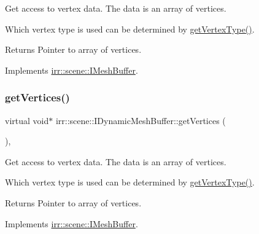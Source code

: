 Get access to vertex data. The data is an array of vertices. 

Which vertex type is used can be determined by \hyperlink{classirr_1_1scene_1_1IDynamicMeshBuffer_a3e7523774efaf9a177de6396dfdc14e2}{get\+Vertex\+Type()}. \begin{DoxyReturn}{Returns}
Pointer to array of vertices. 
\end{DoxyReturn}


Implements \hyperlink{classirr_1_1scene_1_1IMeshBuffer_a99891e516246b2cff13b362a435c8028}{irr\+::scene\+::\+I\+Mesh\+Buffer}.

\mbox{\label{classirr_1_1scene_1_1IDynamicMeshBuffer_a449643505823c7cfe793c5a82cde5fa4}} 
\subsubsection{\texorpdfstring{get\+Vertices()}{getVertices()}\hspace{0.1cm}{\footnotesize\ttfamily [2/2]}}
{\footnotesize\ttfamily virtual void$\ast$ irr\+::scene\+::\+I\+Dynamic\+Mesh\+Buffer\+::get\+Vertices (\begin{DoxyParamCaption}{ }\end{DoxyParamCaption})\hspace{0.3cm}{\ttfamily [inline]}, {\ttfamily [virtual]}}



Get access to vertex data. The data is an array of vertices. 

Which vertex type is used can be determined by \hyperlink{classirr_1_1scene_1_1IDynamicMeshBuffer_a3e7523774efaf9a177de6396dfdc14e2}{get\+Vertex\+Type()}. \begin{DoxyReturn}{Returns}
Pointer to array of vertices. 
\end{DoxyReturn}


Implements \hyperlink{classirr_1_1scene_1_1IMeshBuffer_ac1695efc198b05a086487606bc2783e7}{irr\+::scene\+::\+I\+Mesh\+Buffer}.

\mbox{\label{classirr_1_1scene_1_1IDynamicMeshBuffer_adbe127e3774de6ae7ce96cb534a336e5}} 
